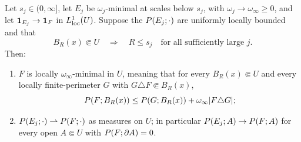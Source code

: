 \begin{lemma}
\label{lem:perimeter-measure-convergence}
Let $s_j\in(0,\infty]$, let $E_j$ be $\omega_j$-minimal at scales below
$s_j$, with $\omega_j\to\omega_\infty\ge0$, and let
$\mathbf 1_{E_j}\to\mathbf 1_{F}$ in $L^1_{\mathrm{loc}}(U)$.  Suppose the
$P(E_j;\cdot)$ are uniformly locally bounded and that
\begin{equation}\label{eq:pmc-admissible-scales}
  B_R(x)\Subset U\quad\Longrightarrow\quad
  R\le s_j\quad\text{for all sufficiently large }j.
\end{equation}
Then:
\begin{enumerate}[label=(\roman*)]
\item\label{it:pmc-minimal} $F$ is locally $\omega_\infty$-minimal in $U$,
  meaning that for every $B_R(x)\Subset U$ and every locally
  finite-perimeter $G$ with $G\triangle F\Subset B_R(x)$,
  \[
    P(F;B_R(x))\le P(G;B_R(x))
       +\omega_\infty|F\triangle G|;
  \]
\item\label{it:pmc-measures} $P(E_j;\cdot)\rightharpoonup P(F;\cdot)$
  as measures on $U$; in particular $P(E_j;A)\to P(F;A)$ for every open
  $A\Subset U$ with $P(F;\partial A)=0$.
\end{enumerate}
\end{lemma}

